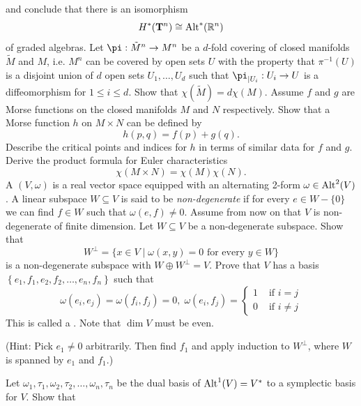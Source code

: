 \begin{enumerate}[\theexercise.1]
\[    \]
    and conclude that there is an isomorphism
    \[
      {H}^*( {\mathbf{T}}^{n})  \cong  {\operatorname{Alt}}^*( {\mathbb{R}}^{n})
    \]
    of graded algebras.
  \NewItem Let $\pi: {\tilde{M}}^{n} \ra  {M}^{n}$ be a $d$-fold covering of closed manifolds $\tilde{M}$ and $M$, i.e. ${M}^{n}$ can be covered by open sets $U$ with the property that ${\pi }^{-1}( U)$ is a disjoint union of $d$ open sets ${U}_{1},\ldots,{U}_{d}$ such that ${\pi }_{\mid {U}_{i}} : {U}_{i} \ra  U$ is a diffeomorphism for $1 \leq  i \leq  d$. Show that $\chi ( \tilde{M})  = {d\chi }( M)$.
  \NewItem Assume $f$ and $g$ are Morse functions on the closed manifolds $M$ and $N$ respectively. Show that a Morse function $h$ on $M \times  N$ can be defined by
    \[
      h( {p,q})  = f( p)  + g( q).
    \]
    Describe the critical points and indices for $h$ in terms of similar data for $f$ and $g$. Derive the product formula for Euler characteristics
    \[
      \chi ( {M \times  N})  = \chi ( M) \chi ( N).
    \]
  \newchap[13]
  \NewItem A  $( {V,\omega })$ is a real vector space equipped with an alternating 2-form $\omega  \in  {\operatorname{Alt}}^{2}( V)$. A linear subspace $W \subseteq  V$ is said to be \textit{non-degenerate} if for every $e \in  W- \{ 0\}$ we can find $f \in  W$ such that $\omega ( {e,f})  \neq  0$. Assume from now on that $V$ is non-degenerate of finite dimension.
    Let $W \subseteq  V$ be a non-degenerate subspace. Show that
    \[
      {W}^{ \bot  } = \{ x \in  V \mid  \omega ( {x,y})  = 0\text{ for every }y \in  W\}
    \]
    is a non-degenerate subspace with $W \oplus  {W}^{ \bot  } = V$. Prove that $V$ has a basis $\left\{  {{e}_{1},{f}_{1},{e}_{2},{f}_{2},\ldots,{e}_{n},{f}_{n}}\right\}$ such that
    \[
      \omega ( {{e}_{i},{e}_{j}})  = \omega ( {{f}_{i},{f}_{j}})  = 0,\;\omega ( {{e}_{i},{f}_{j}})  = 
      \begin{cases}
        1 & \text{ if } i = j \\  
        0 & \text{ if } i \neq  j 
      \end{cases}
    \]
    This is called a . Note that $\dim V$ must be even.
    \par(Hint: Pick ${e}_{1} \neq  0$ arbitrarily. Then find ${f}_{1}$ and apply induction to ${W}^{ \bot  }$, where $W$ is spanned by ${e}_{1}$ and ${f}_{1}$.)\par
    Let ${\omega }_{1},{\tau }_{1},{\omega }_{2},{\tau }_{2},\ldots,{\omega }_{n},{\tau }_{n}$ be the dual basis of ${\operatorname{Alt}}^{1}( V)  = {V}^*$ to a symplectic basis for $V$. Show that

\end{enumerate}
